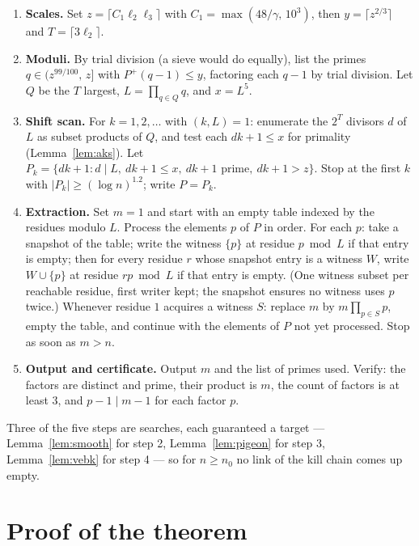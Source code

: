 \documentclass[11pt]{amsart}
\begin{document}
\begin{enumerate}
\item[\textbf{1.}] \textbf{Scales.} Set
$z = \lceil C_1 \ell_2 \ell_3 \rceil$ with
$C_1 = \max(48/\gamma,\,10^3)$, then $y = \lceil z^{2/3} \rceil$ and
$T = \lceil 3\ell_2 \rceil$.

\item[\textbf{2.}] \textbf{Moduli.} By trial division (a sieve would do
equally), list the primes $q \in (z^{99/100},\, z]$ with
$P^+(q-1) \le y$, factoring each $q-1$ by trial division. Let $Q$ be the $T$
largest, $L = \prod_{q \in Q} q$, and $x = L^5$.

\item[\textbf{3.}] \textbf{Shift scan.} For $k = 1, 2, \dots$ with
$(k, L) = 1$: enumerate the $2^T$ divisors $d$ of $L$ as subset products
of $Q$, and test each $dk+1 \le x$ for primality
(Lemma~\ref{lem:aks}). Let
$P_k = \{dk+1 : d \mid L,\ dk+1 \le x,\ dk+1 \text{ prime},\ dk+1 > z\}$.
Stop at the first $k$ with $|P_k| \ge (\log n)^{1.2}$; write
$P = P_k$.

\item[\textbf{4.}] \textbf{Extraction.} Set $m = 1$ and start with an
empty table indexed by the residues modulo $L$. Process the elements
$p$ of $P$ in order. For each $p$: take a snapshot of the table; write
the witness $\{p\}$ at residue $p \bmod L$ if that entry is empty; then
for every residue $r$ whose snapshot entry is a witness $W$, write
$W \cup \{p\}$ at residue $rp \bmod L$ if that entry is empty. (One
witness subset per reachable residue, first writer kept; the snapshot
ensures no witness uses $p$ twice.) Whenever residue $1$ acquires a
witness $S$: replace $m$ by $m\prod_{p\in S} p$, empty the table, and
continue with the elements of $P$ not yet processed. Stop as soon as
$m > n$.

\item[\textbf{5.}] \textbf{Output and certificate.} Output $m$ and the
list of primes used. Verify: the factors are distinct and prime, their
product is $m$, the count of factors is at least $3$, and
$p - 1 \mid m - 1$ for each factor $p$.
\end{enumerate}

Three of the five steps are searches, each guaranteed a target ---
Lemma~\ref{lem:smooth} for step 2, Lemma~\ref{lem:pigeon} for step 3,
Lemma~\ref{lem:vebk} for step 4 --- so for $n \ge n_0$ no link of the
kill chain comes up empty.

\section{Proof of the theorem}
\label{sec:proof}
\end{document}
